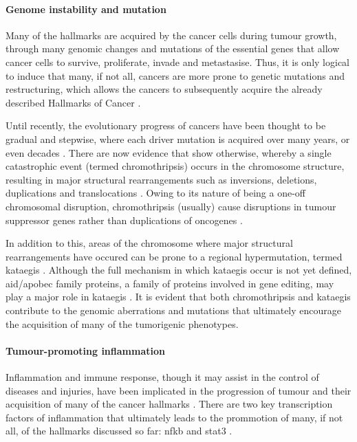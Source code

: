 \paragraph{Genome instability and mutation}

\noindent
Many of the hallmarks are acquired by the cancer cells during tumour growth, through many genomic changes and mutations of the essential genes that allow cancer cells to survive, proliferate, invade and metastasise.
Thus, it is only logical to induce that many, if not all, cancers are more prone to genetic mutations and restructuring, which allows the cancers to subsequently acquire the already described Hallmarks of Cancer \citep{Hanahan2011}.

Until recently, the evolutionary progress of cancers have been thought to be gradual and stepwise, where each driver mutation is acquired over many years, or even decades \citep{Stephens2011}.
There are now evidence that show otherwise, whereby a single catastrophic event (termed \gls{chromothripsis}) occurs in the chromosome structure, resulting in major structural rearrangements such as inversions, deletions, duplications and translocations \citep{Leibowitz2015,Stephens2011}.
Owing to its nature of being a one-off chromosomal disruption, chromothripsis (usually) cause disruptions in tumour suppressor genes rather than duplications of oncogenes \citep{Leibowitz2015}.

In addition to this, areas of the chromosome where major structural rearrangements have occured can be prone to a regional hypermutation, termed \gls{kataegis} \citep{Leibowitz2015,Nik-Zainal2012}.
Although the full mechanism in which \gls{kataegis} occur is not yet defined, \gls{aid}/\acrshort{apobec} family proteins, a family of proteins involved in gene editing, may play a major role in \gls{kataegis} \citep{Leibowitz2015,Nik-Zainal2012}.
It is evident that both \gls{chromothripsis} and \gls{kataegis} contribute to the genomic aberrations and mutations that ultimately encourage the acquisition of many of the tumorigenic phenotypes.

\paragraph{Tumour-promoting inflammation}

\noindent
Inflammation and immune response, though it may assist in the control of diseases and injuries, have been implicated in the progression of tumour and their acquisition of many of the cancer hallmarks \citep{Hanahan2011}.
There are two key transcription factors of inflammation that ultimately leads to the prommotion  of many, if not all, of the hallmarks discussed so far: \gls{nfkb} and \gls{stat3} \citep{Mantovani2008}.


